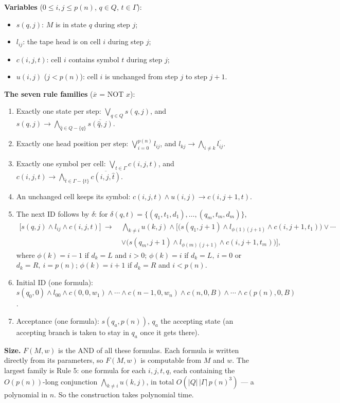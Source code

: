 \documentclass[11pt,a4paper]{article}
\begin{document}
\begin{solution}
\textbf{Variables} ($0\le i,j\le p(n)$, $q\in Q$, $t\in\Gamma$):
\begin{itemize}
\item $s(q,j)$: $M$ is in state $q$ during step $j$;
\item $l_{ij}$: the tape head is on cell $i$ during step $j$;
\item $c(i,j,t)$: cell $i$ contains symbol $t$ during step $j$;
\item $u(i,j)$ ($j<p(n)$): cell $i$ is unchanged from step $j$ to step $j+1$.
\end{itemize}
\textbf{The seven rule families} ($\overline{x}$ = NOT $x$):
\begin{enumerate}[label=\textbf{Rule \arabic*.},leftmargin=*]
\item Exactly one state per step: $\bigvee_{q\in Q}s(q,j)$, and $s(q,j)\rightarrow\bigwedge_{\hat q\in Q-\{q\}}\overline{s(\hat q,j)}$.
\item Exactly one head position per step: $\bigvee_{i=0}^{p(n)}l_{ij}$, and $l_{kj}\rightarrow\bigwedge_{i\neq k}\overline{l_{ij}}$.
\item Exactly one symbol per cell: $\bigvee_{t\in\Gamma}c(i,j,t)$, and $c(i,j,t)\rightarrow\bigwedge_{\hat t\in\Gamma-\{t\}}\overline{c(i,j,\hat t)}$.
\item An unchanged cell keeps its symbol: $c(i,j,t)\wedge u(i,j)\rightarrow c(i,j+1,t)$.
\item The next ID follows by $\delta$: for $\delta(q,t)=\{(q_1,t_1,d_1),\dots,(q_m,t_m,d_m)\}$,
\[\begin{aligned}\big[s(q,j)\wedge l_{ij}\wedge c(i,j,t)\big]\ \rightarrow\ &\bigwedge_{k\neq i}u(k,j)\wedge\Big[\big(s(q_1,j{+}1)\wedge l_{\phi(1)(j+1)}\wedge c(i,j{+}1,t_1)\big)\vee\cdots\\ &\vee\big(s(q_m,j{+}1)\wedge l_{\phi(m)(j+1)}\wedge c(i,j{+}1,t_m)\big)\Big],\end{aligned}\]
where $\phi(k)=i-1$ if $d_k=L$ and $i>0$; $\phi(k)=i$ if $d_k=L,\ i=0$ or $d_k=R,\ i=p(n)$; $\phi(k)=i+1$ if $d_k=R$ and $i<p(n)$.
\item Initial ID (one formula): $s(q_0,0)\wedge l_{00}\wedge c(0,0,w_1)\wedge\cdots\wedge c(n-1,0,w_n)\wedge c(n,0,B)\wedge\cdots\wedge c(p(n),0,B)$.
\item Acceptance (one formula): $s(q_a,p(n))$, $q_a$ the accepting state (an accepting branch is taken to stay in $q_a$ once it gets there).
\end{enumerate}
\textbf{Size.} $F(M,w)$ is the AND of all these formulas. Each formula is written directly from its parameters, so $F(M,w)$ is computable from $M$ and $w$. The largest family is Rule 5: one formula for each $i,j,t,q$, each containing the $O(p(n))$-long conjunction $\bigwedge_{k\neq i}u(k,j)$, in total $O(|Q|\,|\Gamma|\,p(n)^3)$ --- a polynomial in $n$. So the construction takes polynomial time.


\end{solution}
\end{document}
